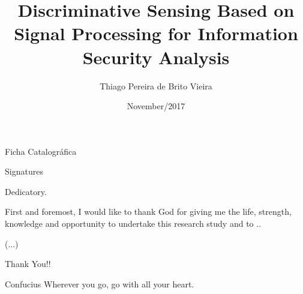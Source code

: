 \documentclass[en, oneside, onehalfspacing]{risethesis}
\title{Discriminative Sensing Based on Signal Processing for Information Security Analysis}
\date{November/2017}
\author{Thiago Pereira de Brito Vieira}
\begin{document}
\frontmatter
\frontpage
\presentationpage

\begin{dedicatory}Ficha Catalográfica\end{dedicatory}

\begin{dedicatory}Signatures\end{dedicatory}

\begin{dedicatory}Dedicatory.\end{dedicatory}

\agradecimentos
First and foremost, I would like to thank God for giving me the life, strength, knowledge and opportunity to undertake this research study and to ..

(...)

Thank You!!

\begin{epigraph}[]{Confucius}
	Wherever you go, go with all your heart.
\end{epigraph}

\resumo


\abstract


\tableofcontents

\makeatletter
\renewcommand{\@thesubfigure}{\thesubfigure:\hskip\subfiglabelskip}
\makeatother
\setcounter{lofdepth}{2}

\listoffigures
\listoftables


\mainmatter
	






\appendix







\clearpage
\addappheadtotoc
\end{document}
